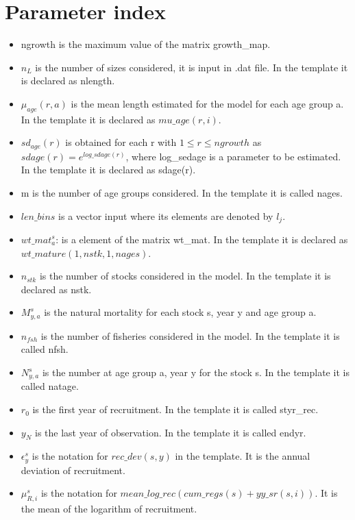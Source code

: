 \documentclass{article}
\begin{document}
\section{Parameter index}
\begin{itemize}
    \item ngrowth is the maximum value of the matrix growth\_map.
   \item $n_L$ is the number of sizes considered, it is input in .dat file. In the template it is declared as nlength.
   \item $\mu_{age}(r,a)$ is the mean length estimated for the model for each age group a. In the template it is declared as $mu\_age(r,i)$.
   \item $sd_{age}(r)$ is obtained  for each r with $1\leq r\leq ngrowth$ as $sdage(r)   = e^{log\_sdage(r)}$, where log\_sedage is a parameter to be estimated. In the template it is declared as sdage(r).
   \item m is the number of age groups considered. In the template it is called  nages.   %
   \item $len\_bins$ is a vector input where its elements are denoted by $l_j$.
    \item $wt\_mat^s_a$: is a element of the matrix wt\_mat. In the template it is declared as $wt\_mature(1,nstk,1,nages)$.
    \item $n_{stk}$ is the number of stocks considered in the model. In the template it is declared as nstk.
    \item $M^s_{y,a}$ is the natural mortality for each stock s, year y and age group a.
    \item $n_{fsh}$ is the number of fisheries considered in the model. In the template it is called nfsh.
    \item $N^s_{y,{a}}$ is the number at age group a, year y for the stock s. In the template it is called  natage.
    \item $r_0$ is the first year of recruitment. In the template it is called  styr\_rec.
    \item $y_N$ is the last year of observation. In the template it is called endyr.
    \item $\epsilon^s_y$ is the notation for $rec\_dev(s,y)$ in the template. It is the annual deviation of recruitment. 
    \item $\mu^s_{R,i}$ is the notation for $mean\_log\_rec(cum\_regs(s)+yy\_sr(s,i))$. It is the mean  of the logarithm of recruitment.

\end{itemize}
\end{document}
